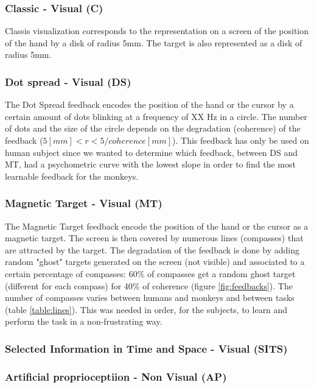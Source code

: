 \documentclass[preprint,12pt]{elsarticle}
\begin{document}
\subsubsection{Classic - Visual (C)}
Classis visualization corresponds to the representation on a screen of the position of the hand by a disk of radius 5mm. The target is also represented as a disk of radius 5mm.
\subsubsection{Dot spread - Visual (DS)}
The Dot Spread feedback encodes the position of the hand or the cursor by a certain amount of dots blinking at a frequency of XX Hz in a circle. The number of dots and the size of the circle depends on the degradation (coherence) of the feedback ($ 5 [mm] < r <5/coherence [mm]$). This feedback has only be used on human subject since we wanted to determine which feedback, between DS and MT, had a psychometric curve with the lowest slope in order to find the most learnable feedback for the monkeys.
\subsubsection{Magnetic Target - Visual (MT)}
The Magnetic Target feedback encode the position of the hand or the cursor as a magnetic target. The screen is then covered by numerous lines (compasses) that are attracted by the target. The degradation of the feedback is done by adding random "ghost" targets generated on the screen (not visible) and associated to a certain percentage of compasses: 60\% of compasses get a random ghost target (different for each compass) for 40\% of coherence (figure \ref{fig:feedbacks}). The number of compasses varies between humans and monkeys and between tasks (table \ref{table:lines}). This was needed in order, for the subjects, to learn and perform the task in a non-frustrating way.
\subsubsection{Selected Information in Time and Space - Visual (SITS)}
\subsubsection{Artificial proprioceptiion - Non Visual (AP)}
\end{document}
